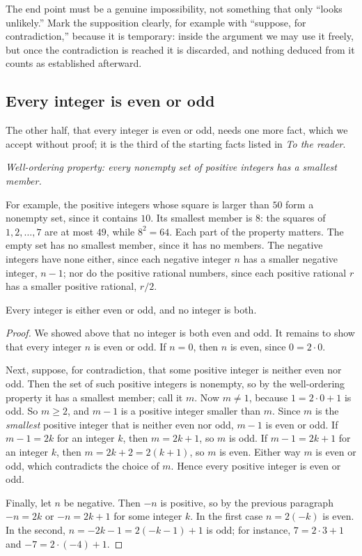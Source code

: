 The end point must be a genuine impossibility, not something that only ``looks unlikely.'' Mark the supposition clearly, for example with ``suppose, for contradiction,'' because it is temporary: inside the argument we may use it freely, but once the contradiction is reached it is discarded, and nothing deduced from it counts as established afterward.

\subsection*{Every integer is even or odd}
The other half, that every integer is even or odd, needs one more fact, which we accept without proof; it is the third of the starting facts listed in \emph{To the reader}.
\begin{center}
\emph{Well-ordering property: every nonempty set of positive integers has a smallest member.}
\end{center}
For example, the positive integers whose square is larger than $50$ form a nonempty set, since it contains $10$. Its smallest member is $8$: the squares of $1,2,\ldots,7$ are at most $49$, while $8^2=64$. Each part of the property matters. The empty set has no smallest member, since it has no members. The negative integers have none either, since each negative integer $n$ has a smaller negative integer, $n-1$; nor do the positive rational numbers, since each positive rational $r$ has a smaller positive rational, $r/2$.

\par\noindent\begin{minipage}{\linewidth}
\begin{lemma}\label{ch04:lem:even-or-odd}
Every integer is either even or odd, and no integer is both.
\end{lemma}
\end{minipage}\par

\begin{proof}
We showed above that no integer is both even and odd. It remains to show that every integer $n$ is even or odd. If $n=0$, then $n$ is even, since $0=2\cdot0$.

Next, suppose, for contradiction, that some positive integer is neither even nor odd. Then the set of such positive integers is nonempty, so by the well-ordering property it has a smallest member; call it $m$. Now $m\ne1$, because $1=2\cdot0+1$ is odd. So $m\ge2$, and $m-1$ is a positive integer smaller than $m$. Since $m$ is the \emph{smallest} positive integer that is neither even nor odd, $m-1$ is even or odd. If $m-1=2k$ for an integer $k$, then $m=2k+1$, so $m$ is odd. If $m-1=2k+1$ for an integer $k$, then $m=2k+2=2(k+1)$, so $m$ is even. Either way $m$ is even or odd, which contradicts the choice of $m$. Hence every positive integer is even or odd.

Finally, let $n$ be negative. Then $-n$ is positive, so by the previous paragraph $-n=2k$ or $-n=2k+1$ for some integer $k$. In the first case $n=2(-k)$ is even. In the second, $n=-2k-1=2(-k-1)+1$ is odd; for instance, $7=2\cdot3+1$ and $-7=2\cdot(-4)+1$.
\end{proof}

